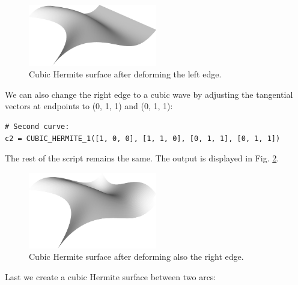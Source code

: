 \begin{figure}[!ht]
\begin{center}
\includegraphics[width=0.5\textwidth]{img/curves-14c.png}
\end{center}
\vspace{-6mm}
\caption{Cubic Hermite surface after deforming the left edge.}
\label{fig:curves-14c}
\end{figure}
\noindent
We can also change the right edge to a cubic wave by adjusting 
the tangential vectors at endpoints to (0, 1, 1) and (0, 1, 1):\\

\begin{bbox}
\begin{verbatim}
# Second curve:
c2 = CUBIC_HERMITE_1([1, 0, 0], [1, 1, 0], [0, 1, 1], [0, 1, 1])
\end{verbatim}
\end{bbox}
\vspace{6mm}

\noindent
The rest of the script remains the same. The output is displayed in Fig. \ref{fig:curves-14d}.

\begin{figure}[!ht]
\begin{center}
\includegraphics[width=0.5\textwidth]{img/curves-14d.png}
\end{center}
\vspace{-6mm}
\caption{Cubic Hermite surface after deforming also the right edge.}
\label{fig:curves-14d}
\end{figure}
\noindent
\noindent
Last we create a cubic Hermite surface between two arcs:\\

